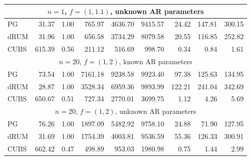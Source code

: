\documentclass[11pt]{article}
\begin{document}
\begin{table}
\begin{tabular}{l r r r r r r r r }
\hline
\multicolumn{9}{c}{$n=1$, $f = (1,1.1)$, unknown AR parameters} \\
\hline
             PG   &    31.37 &     1.00 &    765.97 &   4636.70 &   9415.57 &     24.42 &    147.81 &    300.15 \\ 
           dRUM   &    31.96 &     1.00 &    656.58 &   3734.29 &   8079.58 &     20.55 &    116.85 &    252.82 \\ 
           CUBS   &   615.39 &     0.56 &    211.12 &    516.69 &    998.70 &      0.34 &      0.84 &      1.61
 \\ %

\hline
\multicolumn{9}{c}{$n=20$, $f = (1,2)$, known AR parameters} \\
\hline
             PG   &    73.54 &     1.00 &   7161.18 &   9238.58 &   9923.40 &     97.38 &    125.63 &    134.95 \\ 
           dRUM   &    28.87 &     1.00 &   3528.34 &   6959.36 &   9893.99 &    122.21 &    241.04 &    342.69 \\ 
           CUBS   &   650.67 &     0.51 &    727.34 &   2770.01 &   3699.75 &      1.12 &      4.26 &      5.69
 \\ %


\hline
\multicolumn{9}{c}{$n=20$, $f = (1,2)$, unknown AR parameters} \\
\hline
             PG   &    76.26 &     1.00 &   1897.09 &   5482.92 &   9758.10 &     24.88 &     71.90 &    127.95 \\ 
           dRUM   &    31.69 &     1.00 &   1754.39 &   4003.81 &   9536.59 &     55.36 &    126.33 &    300.91 \\ 
           CUBS   &   662.42 &     0.47 &    498.89 &    953.03 &   1980.98 &      0.75 &      1.44 &      2.99
 \\ %



\end{tabular}
\end{table}
\end{document}
